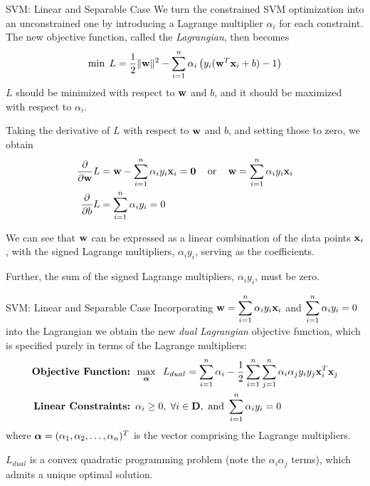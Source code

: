 \begin{frame}{SVM: Linear and Separable Case}
  \small
We turn the constrained SVM optimization into an unconstrained one by
introducing a
Lagrange multiplier $\alpha_i$ for each constraint.
The new objective function, called the {\em Lagrangian}, then becomes
\begin{align*}
    \min \; L = {1 \over 2}\|\mathbf{w}\|^2 - \displaystyle \sum_{i=1}^n \alpha_i \left(y_i
  (\mathbf{w}^T\mathbf{x}_i + b) - 1\right)
\end{align*}
$L$ should be minimized with respect to $\mathbf{w}$ and $b$,
and it should be maximized with respect to $\alpha_i$.

Taking the derivative of $L$ with respect to
$\mathbf{w}$ and $b$, and setting those to zero, we
obtain
\begin{align*}
\frac{\partial}{\partial \mathbf{w}}L & =
\mathbf{w}-\displaystyle \sum_{i=1}^n \alpha_{i}y_{i}\mathbf{x}_{i} = \mathbf{0} \;\;\;\mbox { or }\;\;\;
\mathbf{w} = \displaystyle \sum_{i=1}^n \alpha_{i}y_{i}\mathbf{x}_{i}\\
\frac{\partial}{\partial b} L & = \displaystyle \sum_{i=1}^n \alpha_{i}y_{i}= 0
\end{align*}

\medskip
We can see that $\mathbf{w}$ can be expressed as a linear combination of the
data points $\mathbf{x}_i$, with the signed Lagrange multipliers,
$\alpha_iy_i$, serving as the coeff\/{i}cients. 

\medskip
Further, the sum of the signed
Lagrange multipliers, $\alpha_iy_i$, must be zero.
\end{frame}


\begin{frame}{SVM: Linear and Separable Case}
Incorporating $\mathbf{w} = \displaystyle \sum_{i=1}^n \alpha_{i}y_{i}\mathbf{x}_{i}$ and 
$\displaystyle \sum_{i=1}^n \alpha_{i}y_{i}= 0$ into the Lagrangian we obtain the new 
{\em dual
  Lagrangian} objective function, 
  which is specified purely in terms of the Lagrange multipliers:
\begin{align*}
    \mbox{\bf Objective Function: } &  \max_{{\bm \alpha}}\;\;
     L_{dual} = \displaystyle \sum_{i=1}^n\alpha_{i} - {1 \over 2} \displaystyle \sum_{i=1}^n
  \displaystyle \sum_{j=1}^n \alpha_i\alpha_{j} y_i y_{j} \mathbf{x}_i^T\mathbf{x}_{j}\\
  \mbox{\bf Linear Constraints: }& \alpha_i \ge 0, \;
  \forall i \in \mathbf{D}, \text{ and } \sum_{i=1}^n \alpha_i y_i = 0
\end{align*}
where ${\bm \alpha} = (\alpha_1, \alpha_2,\ldots, \alpha_n)^T$ is the vector comprising the Lagrange multipliers. 

\medskip
$L_{dual}$ is a convex quadratic programming problem (note the
$\alpha_i\alpha_{j}$ terms), which admits a unique optimal solution.
\end{frame}



